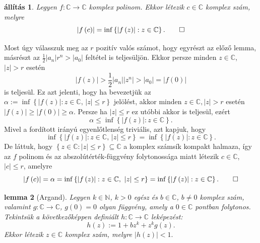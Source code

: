 \documentclass[a4paper, showtrims]{memoir}
\makeatletter
\renewenvironment{proof}[1][\proofname]
    {\par\pushQED{\qed}%
    \normalfont \topsep6\p@\@plus6\p@\relax
    \trivlist
    \item[\hskip\labelsep
        \itshape
    #1\@addpunct{:}]\ignorespaces}
    {\popQED\endtrivlist\@endpefalse}
\theoremstyle{plain}
\newtheorem{proposition}{állítás}[chapter]
\newtheorem{lemma}[proposition]{lemma}
\theoremstyle{remark}
\theoremstyle{definition}
\makeatother
\begin{document}
\begin{proposition}
	\label{Th:Cauchy1}Legyen $f:\mathbb{C}\rightarrow \mathbb{C}$ komplex polinom.
	Ekkor létezik $c\in \mathbb{C}$ komplex szám, melyre
	\[
		\left| f\left( c\right) \right| =\inf \left\{ \left| f\left( z\right)
		\right| :z\in \mathbb{C}\right\} .\qedhere
	\]
\end{proposition}
\begin{proof}
	Most úgy válasszuk meg az $r$ pozitív valós számot,
	hogy egyrészt az előző lemma, másrészt az
	$\frac{1}{2}\left|a_{n}\right| r^{n}>\left| a_{0}\right|$
	feltétel is teljesüljön.
	Ekkor
	persze minden $z\in \mathbb{C}$, $\left| z\right| >r$ esetén
	\[
		\left| f\left( z\right) \right| >\frac{1}{2}\left| a_{n}\right| \left|
		z^{n}\right| >\left| a_{0}\right| =\left| f\left( 0\right) \right|
	\]
	is teljesül.
	Ez azt jelenti, hogy ha bevezetjük az $\alpha :=\inf \left\{ \left|
		f\left( z\right) \right| :z\in \mathbb{C}\text{, }\left| z\right| \leq
		r\right\} $ jelölést, akkor minden $z\in \mathbb{C},\left| z\right| >r$
	esetén $\left| f\left( z\right) \right| \geq \left| f\left( 0\right)
		\right| \geq \alpha .$ Persze ha $\left| z\right| \leq r$ ez utóbbi
	akkor is teljesül, ezért
	\[
		\alpha \leq \inf \left\{ \left| f\left( z\right) \right| :z\in \mathbb{C}\right\} .
	\]
	Mivel a fordított irányú egyenlőtlenség triviális,
	azt kapjuk, hogy
	\[
		\inf \left\{ \left| f\left( z\right) \right| :z\in \mathbb{C}\text{, }\left|
		z\right| \leq r\right\} =\inf \left\{ \left| f\left( z\right) \right| :z\in
		\mathbb{C}\right\} .
	\]
	De láttuk, hogy $\left\{ z\in \mathbb{C}:\left| z\right| \leq r\right\}
		\subseteq \mathbb{C}$ a komplex számsík kompakt halmaza, így az $f$
	polinom és az abszolútérték-függvény folytonossága miatt létezik $c\in \mathbb{C}$, $\left| c\right| \leq r$, amelyre
	\[
		\left| f\left( c\right) \right| =\alpha =\inf \left\{ \left| f\left(
		z\right) \right| :z\in \mathbb{C}\text{, }\left| z\right| \leq r\right\} =\inf
		\left\{ \left| f\left( z\right) \right| :z\in \mathbb{C}\right\}. \qedhere
	\]
\end{proof}

\begin{lemma}[Argand]
	\label{Th:Argand}Legyen $k\in \mathbb{N}$, $k>0$ egész és $b\in \mathbb{C}$, $b\neq 0$ komplex szám, valamint $g:\mathbb{C}\rightarrow \mathbb{C}$, $g\left( 0\right) =0$ olyan függvény, amely a $0\in \mathbb{C}$ pontban
	folytonos.
	Tekintsük a következőképpen definiált $h:\mathbb{C}\rightarrow \mathbb{C}$ leképezést:
	\[
		h\left( z\right) :=1+bz^{k}+z^{k}g\left( z\right) .
	\]
	Ekkor létezik $z\in \mathbb{C}$ komplex szám, melyre $\left| h\left(
		z\right) \right| <1.$
\end{lemma}
\end{document}

